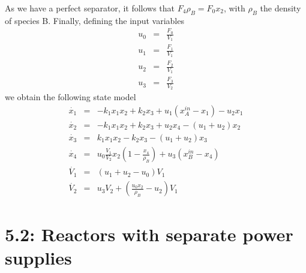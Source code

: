 As we have a perfect separator, it follows that $F_4 \rho_B = F_0 x_2$, with $\rho_B$ the density of species B. Finally, defining the input variables
\begin{eqnarray*}
u_0 &=& \frac{F_0}{V_1}\\
u_1 &=& \frac{F_1}{V_1}\\
u_2 &=& \frac{F_2}{V_1}\\
u_3 &=& \frac{F_3}{V_2}
\end{eqnarray*}
we obtain the following state model
\begin{eqnarray*}
\dot{x_1} &=& -k_1 x_1 x_2+k_2 x_3 + u_1 (x_A^{in}-x_1)-u_2 x_1\\
\dot{x_2} &=& -k_1 x_1 x_2+k_2 x_3 + u_2 x_4-(u_1+u_2)x_2\\
\dot{x_3} &=& k_1 x_1 x_2-k_2 x_3 -(u_1+u_2)x_3\\
\dot{x_4} &=& u_0\frac{V_1}{V_2}x_2(1-\frac{x_4}{\rho_B})+u_3(x_B^{in}-x_4)\\
\dot{V_1} &=& (u_1+u_2-u_0)V_1\\
\dot{V_2} &=& u_3V_2+(\frac{u_0x_2}{\rho_B}-u_2)V_1
\end{eqnarray*}






\section*{5.2: Reactors with separate power supplies}

